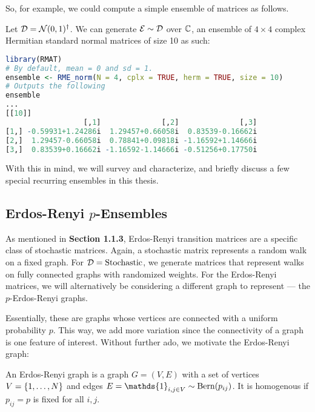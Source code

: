 \medskip
 So, for example, we could compute a simple ensemble of matrices as follows.
\begin{code}
Let $\mathcal{D} = \Normal(0,1)^{\dagger}$. We can generate $\Ens \sim \D$ over $\Cc$, an ensemble of $4 \times 4$ complex Hermitian standard normal matrices of size 10 as such:
\end{code}

\begin{lstlisting}[language=R]
library(RMAT)
# By default, mean = 0 and sd = 1.
ensemble <- RME_norm(N = 4, cplx = TRUE, herm = TRUE, size = 10)
# Outputs the following
ensemble
...
[[10]]
                  [,1]              [,2]              [,3]
[1,] -0.59931+1.24286i  1.29457+0.66058i  0.83539-0.16662i
[2,]  1.29457-0.66058i  0.78841+0.09818i -1.16592+1.14666i
[3,]  0.83539+0.16662i -1.16592-1.14666i -0.51256+0.17750i
\end{lstlisting}

With this in mind, we will survey and characterize, and briefly discuss a few special recurring ensembles in this thesis.


\subsection{Erdos-Renyi $p$-Ensembles}

As mentioned in \textbf{Section 1.1.3}, Erdos-Renyi transition matrices are a specific class of stochastic matrices.
Again, a stochastic matrix represents a random walk on a fixed graph. For $\D = \text{Stochastic}$, we generate matrices that represent walks on fully connected graphs with randomized weights.
For the Erdos-Renyi matrices, we will alternatively be considering a different graph to represent --- the $p$-Erdos-Renyi graphs.

Essentially, these are graphs whose vertices are connected with a uniform probability $p$.
This way, we add more variation since the connectivity of a graph is one feature of interest.
Without further ado, we motivate the Erdos-Renyi graph:

\begin{definition}
An Erdos-Renyi graph is a graph $G = (V,E)$ with a set of vertices $V = \{\oneto[N]\}$ and edges $E = \mathds{1}_{i,j \in V} \sim \Bern(p_{ij})$. It is homogenous if $p_{ij} = p$ is fixed for all $i, j$.
\end{definition}

